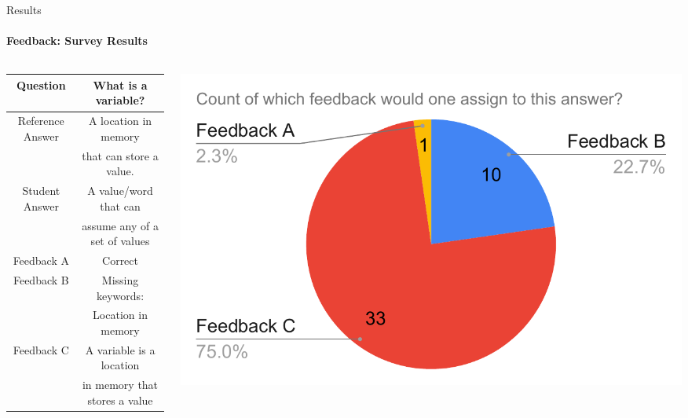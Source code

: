\documentclass[aspectratio=169]{beamer}
\begin{document}
\begin{frame}{Results}
	\framesubtitle{Feedback: Survey Results}
	\begin{columns}
		\begin{column}{0.65\textwidth}
		\begin{table}
			\begin{tabular}{ |c|c| }
				\hline
				Question & What is a variable?  
				\\ \hline 
				Reference Answer & A location in memory\\& that can store a value.
				\\ \hline
				Student Answer & A value/word that can\\& assume any of a set of values
				\\ \hline
				Feedback A & Correct
				\\ \hline
				Feedback B & Missing keywords:\\& Location in memory
				\\ \hline
				Feedback C & A variable is a location\\& in memory that stores a value
				\\ \hline
			\end{tabular}
		\end{table}
	\end{column}
	\begin{column}{0.5\textwidth}
		\begin{center}
			\includegraphics[width=1\textwidth]{images/survey_1.pdf}
		\end{center}
	\end{column}
	\end{columns}
\end{frame}
\end{document}
